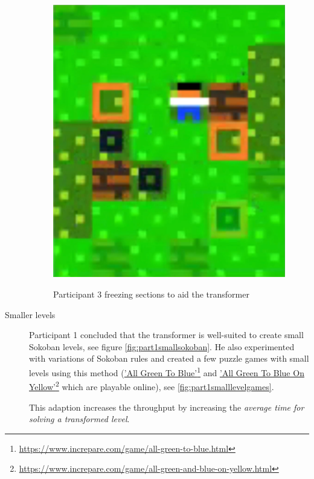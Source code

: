 \begin{description}
\begin{figure}
\begin{minipage}[t]{0.3\textwidth}
\includegraphics[width=\textwidth]{figures/part3helpalittleto.png} \\
\end{minipage}
\caption{Participant 3 freezing sections to aid the transformer\label{fig:part3shelp}}
\end{figure}

    
    \item[Smaller levels] Participant 1 concluded that the transformer is well-suited to create small Sokoban levels, see figure \ref{fig:part1smallsokoban}. He also experimented with variations of Sokoban rules and created a few puzzle games with small levels using this method (\href{https://www.increpare.com/game/all-green-to-blue.html}{'All Green To Blue'}\footnote{\url{https://www.increpare.com/game/all-green-to-blue.html}} and \href{https://www.increpare.com/game/all-green-and-blue-on-yellow.html}{'All Green To Blue On Yellow'}\footnote{\url{https://www.increpare.com/game/all-green-and-blue-on-yellow.html}} which are playable online), see  \autoref{fig:part1smalllevelgames}.
    
    This adaption increases the throughput by increasing the \textit{average time for solving a transformed level}.
    

\end{description}
